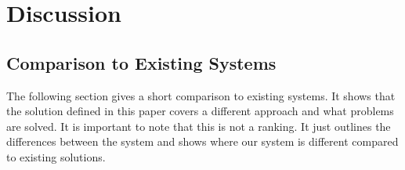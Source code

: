 \documentclass[9pt,journal,compsoc]{IEEEtran}
\begin{document}
%



\section{Discussion}

\subsection{Comparison to Existing Systems}
The following section gives a short comparison to existing systems. It shows that the solution defined in this paper covers a different approach and what problems are solved. It is important to note that this is not a ranking. It just outlines the differences between the system and shows where our system is different compared to existing solutions.
\end{document}
